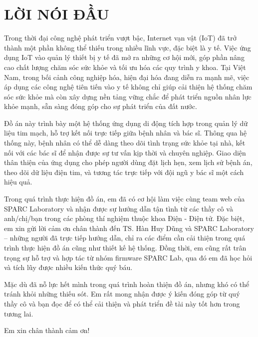 \section*{LỜI NÓI ĐẦU} %
\thispagestyle{empty}
Trong thời đại công nghệ phát triển vượt bậc, Internet vạn vật (IoT) đã trở thành một phần không thể thiếu trong nhiều lĩnh vực, đặc biệt là y tế. Việc ứng dụng IoT vào quản lý thiết bị y tế đã mở ra những cơ hội mới, góp phần nâng cao chất lượng chăm sóc sức khỏe và tối ưu hóa các quy trình y khoa. Tại Việt Nam, trong bối cảnh công nghiệp hóa, hiện đại hóa đang diễn ra mạnh mẽ, việc áp dụng các công nghệ tiên tiến vào y tế không chỉ giúp cải thiện hệ thống chăm sóc sức khỏe mà còn xây dựng nền tảng vững chắc để phát triển nguồn nhân lực khỏe mạnh, sẵn sàng đóng góp cho sự phát triển của đất nước.

Đồ án này trình bày một hệ thống ứng dụng di động tích hợp trong quản lý dữ liệu tim mạch, hỗ trợ kết nối trực tiếp giữa bệnh nhân và bác sĩ. Thông qua hệ thống này, bệnh nhân có thể dễ dàng theo dõi tình trạng sức khỏe tại nhà, kết nối với các bác sĩ để nhận được sự tư vấn kịp thời và chuyên nghiệp. Giao diện thân thiện của ứng dụng cho phép người dùng đặt lịch hẹn, xem lịch sử bệnh án, theo dõi dữ liệu điện tim, và tương tác trực tiếp với đội ngũ y bác sĩ một cách hiệu quả.

Trong quá trình thực hiện đồ án, em đã có cơ hội làm việc cùng team web của SPARC Laboratory và nhận được sự hướng dẫn tận tình từ các thầy cô và anh/chị/bạn trong các phòng thí nghiệm thuộc khoa Điện - Điện tử. Đặc biệt, em xin gửi lời cảm ơn chân thành đến TS. Hàn Huy Dũng và SPARC Laboratory – những người đã trực tiếp hướng dẫn, chỉ ra các điểm cần cải thiện trong quá trình thực hiện đồ án cũng như thiết kế hệ thống. Đồng thời, em cũng rất trân trọng sự hỗ trợ và hợp tác từ nhóm firmware SPARC Lab, qua đó em đã học hỏi và tích lũy được nhiều kiến thức quý báu.

Mặc dù đã nỗ lực hết mình trong quá trình hoàn thiện đồ án, nhưng khó có thể tránh khỏi những thiếu sót. Em rất mong nhận được ý kiến đóng góp từ quý thầy cô và bạn đọc để có thể cải thiện và phát triển đề tài này tốt hơn trong tương lai.

Em xin chân thành cảm ơn!


\cleardoublepage
